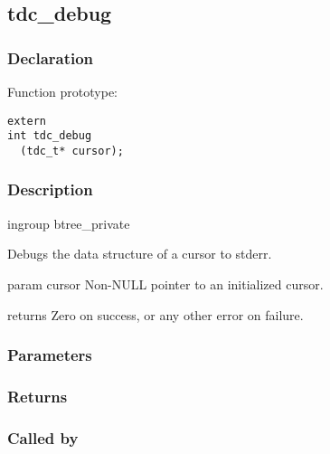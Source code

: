 
\newpage
\subsection{tdc\_debug}
\subsubsection{Declaration} Function prototype:

\begin{verbatim}
extern
int tdc_debug
  (tdc_t* cursor);
\end{verbatim}

\subsubsection{Description}


 ingroup btree\_private

 Debugs the data structure of a cursor to stderr.

 param cursor Non-NULL pointer to an initialized cursor.

 returns Zero on success, or any other error on failure.
 

\subsubsection{Parameters}
\subsubsection{Returns}
\subsubsection{Called by}
